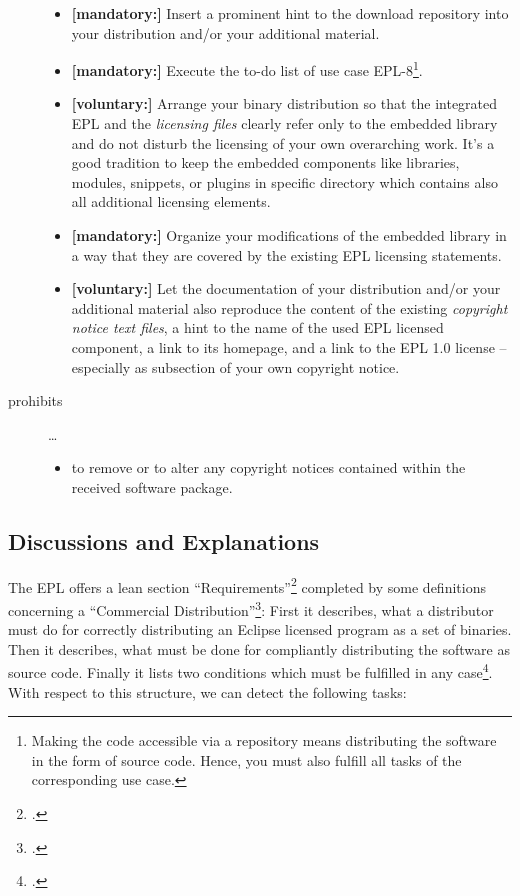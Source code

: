 \begin{description}
\begin{itemize}
  \item \textbf{[mandatory:]} Insert a prominent hint to the download repository
  into your distribution and/or your additional material.
  
  \item \textbf{[mandatory:]} Execute the to-do list of use case EPL-8\footnote{
  Making the code accessible via a repository means distributing the software in
  the form of source code. Hence, you must also fulfill all tasks of the
  corresponding use case.}.
  
  \item \textbf{[voluntary:]} Arrange your binary distribution so that the
  integrated EPL and the \emph{licensing files} clearly refer only to the
  embedded library and do not disturb the licensing of your own overarching
  work. It's a good tradition to keep the embedded components like libraries,
  modules, snippets, or plugins in specific directory which contains also all
  additional licensing elements.
  
  \item \textbf{[mandatory:]} Organize your modifications of the embedded
  library in a way that they are covered by the existing EPL licensing
  statements. 
  
  \item \textbf{[voluntary:]} Let the documentation of your distribution and/or
  your additional material  also reproduce the content of the existing
  \emph{copyright notice text files}, a hint to the name of the used EPL
  licensed component, a link to its homepage, and a link to the EPL 1.0 license
  -- especially as subsection of your own copyright notice.
  
\end{itemize}

\item[prohibits] \ldots
\begin{itemize}
  \item to remove or to alter any copyright notices contained within the
  received software package.
\end{itemize}

\end{description}

\subsection{Discussions and Explanations}

The EPL offers a lean section
\enquote{Requirements}\footcite[cf.][\nopage wp.\ §3]{Epl10OsiLicense2005a}
completed by some definitions concerning a \enquote{Commercial
Distribution}\footcite[cf.][\nopage wp.\ §4]{Epl10OsiLicense2005a}: First it
describes, what a distributor must do for correctly distributing an Eclipse
licensed program as a set of binaries. Then it describes, what must be done for
compliantly distributing the software as source code. Finally it lists two
conditions which must be fulfilled in any case\footcite[cf.][\nopage wp.\
§3]{Epl10OsiLicense2005a}. With respect to this structure, we can detect the
following tasks:


